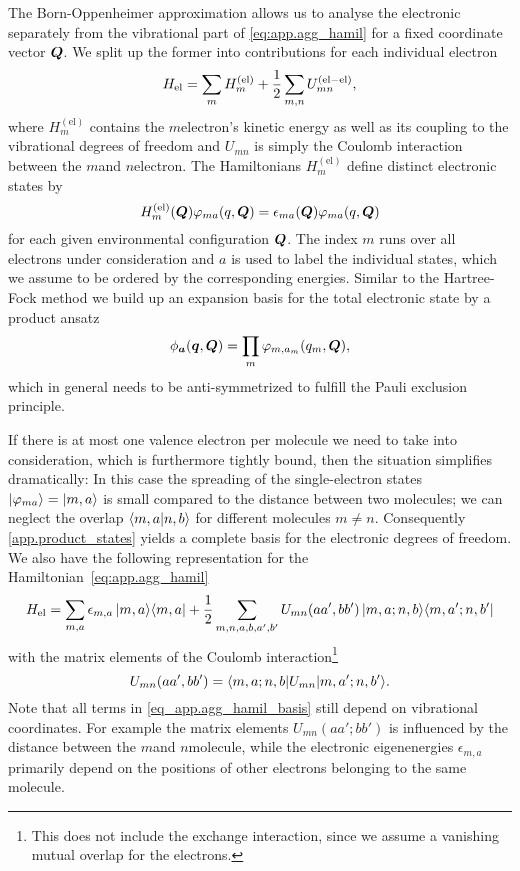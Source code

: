 The Born-Oppenheimer approximation allows us to analyse the electronic separately from the vibrational part of \autoref{eq:app.agg_hamil} for a fixed coordinate vector $\boldsymbol{Q}$.
We split up the former into contributions for each individual electron
\begin{equation*}
  H_\mathrm{el} = \sum_m H_m^\mathrm{(el)} + \frac{1}{2} \sum_{m,n} U_{mn}^\mathrm{(el-el)},
\end{equation*}
where $H_m^\mathrm{(el)}$ contains the $m$\th electron's kinetic energy as well as its coupling to the vibrational degrees of freedom and $U_{mn}$ is simply the Coulomb interaction between the $m$\th and $n$\th electron.
The  Hamiltonians $H_m^\mathrm{(el)}$ define distinct electronic states by
\begin{equation*}
  H_m^\mathrm{(el)}(\boldsymbol{Q}) \varphi_{ma} (q, \boldsymbol{Q}) = \epsilon_{ma}(\boldsymbol{Q}) \varphi_{ma} (q, \boldsymbol{Q})
\end{equation*}
for each given environmental configuration $\boldsymbol{Q}$.
The index $m$ runs over all electrons under consideration and $a$ is used to label the individual states, which we assume to be ordered by the corresponding energies.
Similar to the Hartree-Fock method we build up an expansion basis for the total electronic state by a product ansatz
\begin{equation}
  \phi_{\boldsymbol{a}}(\boldsymbol{q}, \boldsymbol{Q}) = \prod_m \varphi_{m, a_m}(q_m, \boldsymbol{Q}),
  \label{eq:app.product_states}
\end{equation}
which in general needs to be anti-symmetrized to fulfill the Pauli exclusion principle.

If there is at most one valence electron per molecule we need to take into consideration, which is furthermore tightly bound, then the situation simplifies dramatically:
In this case the spreading of the single-electron states $| \varphi_{ma} \rangle = | m, a \rangle$ is small compared to the distance between two molecules; we can neglect the overlap $\langle m, a | n, b \rangle$ for different molecules $m \neq n$.
Consequently \autoref{app.product_states} yields a complete basis for the electronic degrees of freedom.
We also have the following representation for the Hamiltonian~\ref{eq:app.agg_hamil}%
\begin{equation}
  H_\mathrm{el} = \sum_{m, a} \epsilon_{m, a} \, | m, a \rangle\langle m, a | + \frac{1}{2}\sum_{m,n,a,b,a',b'} U_{mn}(aa', bb') \, | m,a; n,b \rangle\langle m,a'; n,b' |
  \label{eq:app.agg_hamil_basis}
\end{equation}
with the matrix elements of the Coulomb interaction\footnote{%
  This does not include the exchange interaction, since we assume a vanishing mutual overlap for the electrons.
}
\begin{equation*}
  U_{mn}(aa', bb') = \langle m,a; n,b | U_{mn} | m,a'; n,b' \rangle.
\end{equation*}
Note that all terms in \autoref{eq_app.agg_hamil_basis} still depend on vibrational coordinates.
For example the matrix elements $U_{mn}(aa'; bb')$ is influenced by the distance between the $m$\th and $n$\th molecule, while the electronic eigenenergies $\epsilon_{m, a}$ primarily depend on the positions of other electrons belonging to the same molecule.

